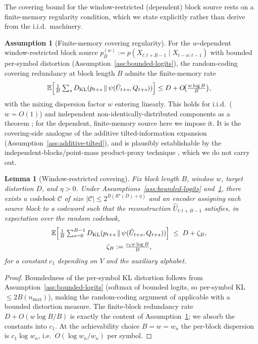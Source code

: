 \documentclass[11pt]{article}
\newcommand{\E}{\mathbb{E}}
\newcommand{\KL}[2]{D_{\mathrm{KL}}(#1 \,\|\, #2)}
\theoremstyle{plain}
\newtheorem{lemma}[theorem]{Lemma}
\theoremstyle{definition}
\newtheorem{assumption}[theorem]{Assumption}
\theoremstyle{remark}
\begin{document}
The covering bound for the window-restricted (dependent) block
source rests on a finite-memory regularity condition, which we
state explicitly rather than derive from the i.i.d.\ machinery.

\begin{assumption}[Finite-memory covering regularity]
\label{ass:covering-reg}
For the $w$-dependent window-restricted block source
$p^{(w)}_B := p(X_{t:t+B-1} \mid X_{t-w:t-1})$ with bounded
per-symbol distortion (Assumption~\ref{ass:bounded-logits}), the
random-coding covering redundancy at block length $B$ admits the
finite-memory rate
\[
\E\Bigl[\tfrac1B\textstyle\sum_{s} \KL{p_{t+s}}{\psi(\hat
   U_{t+s},Q_{t+s})}\Bigr] \leq D + O\!\bigl(\tfrac{w\log B}{B}\bigr),
\]
with the mixing dispersion factor $w$ entering linearly. This holds
for i.i.d.\ ($w=O(1)$) and independent non-identically-distributed
components as a theorem
\citep{kostina2012fixed,tasci2024dispersion}; for the dependent,
finite-memory source here we impose it. It is the covering-side
analogue of the additive tilted-information expansion
(Assumption~\ref{ass:additive-tilted}), and is plausibly
establishable by the independent-blocks/point-mass product-proxy
technique \citep[Ch.~4]{douc2018markov,tasci2024dispersion},
which we do not carry out.
\end{assumption}

\begin{lemma}[Window-restricted covering]\label{lem:wr-covering}
Fix block length $B$, window $w$, target distortion $D$, and
$\eta > 0$. Under Assumptions~\ref{ass:bounded-logits}
and~\ref{ass:covering-reg}, there exists a codebook $\mathcal{C}$
of size $|\mathcal{C}| \leq 2^{B(R^\star(D) + \eta)}$ and an encoder
assigning each source block to a codeword such that the
reconstruction $\hat U_{t:t+B-1}$ satisfies, in expectation over
the random codebook,
\[
\begin{gathered}
\E\Bigl[\tfrac{1}{B}\textstyle\sum_{s=0}^{B-1}
   \KL{p_{t+s}}{\psi(\hat U_{t+s}, Q_{t+s})}\Bigr]
\;\leq\; D + \zeta_B,\\
\zeta_B := \tfrac{c_1 w \log B}{B},
\end{gathered}
\]
for a constant $c_1$ depending on $V$ and the auxiliary alphabet.
\end{lemma}

\begin{proof}
Boundedness of the per-symbol KL distortion follows from
Assumption~\ref{ass:bounded-logits} (softmax of bounded logits,
so per-symbol KL $\leq 2B(n_{\max})$), making the random-coding
argument of \citet[Lemma~3.3]{elgamal2011network} applicable with a
bounded distortion measure. The finite-block redundancy rate
$D + O(w\log B/B)$ is exactly the content of
Assumption~\ref{ass:covering-reg}; we absorb the constants into
$c_1$. At the achievability choice $B = w = w_n$ the per-block
dispersion is $c_1 \log w_n$, i.e.\ $O(\log w_n / w_n)$ per symbol.
\end{proof}
\end{document}
